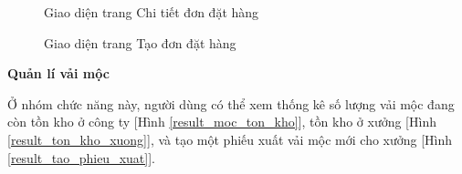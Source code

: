 \begin{figure}[H]
    \begin{center}
        \caption{Giao diện trang Chi tiết đơn đặt hàng}
        \label{result_chi_tiet_don_hang}
    \end{center}
\end{figure}

\begin{figure}[H]
    \begin{center}
        \caption{Giao diện trang Tạo đơn đặt hàng}
        \label{result_tao_don_hang}
    \end{center}
\end{figure}

\textbf{Quản lí vải mộc}

Ở nhóm chức năng này, người dùng có thể xem thống kê số lượng vải mộc đang còn tồn kho ở công ty [Hình \ref{result_moc_ton_kho}], tồn kho ở xưởng [Hình \ref{result_ton_kho_xuong}], và tạo một phiếu xuất vải mộc mới cho xưởng [Hình \ref{result_tao_phieu_xuat}].

